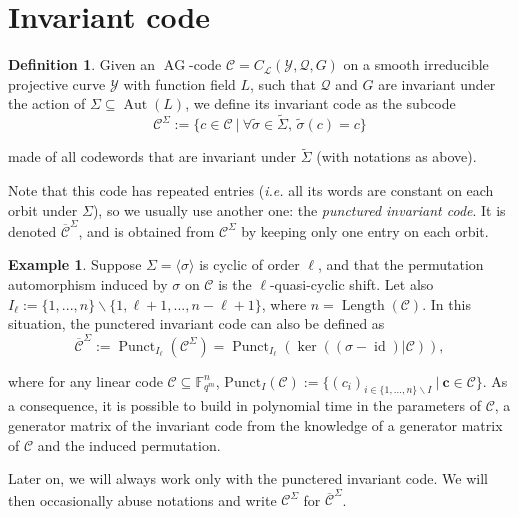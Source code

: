 \documentclass[10pt]{article}
\theoremstyle{definition}
\theoremstyle{definition}
\newtheorem{expl}[thm]{Example}
\theoremstyle{definition}
\newtheorem{def1}[thm]{Definition}
\newcommand{\C}{\mathcal{C}}
\newcommand{\Fqm}{\mathbb{F}_{q^m}}
\newcommand{\su}{\subseteq}
\newcommand{\Y}{\mathcal{Y}}
\newcommand{\QR}{\mathcal{Q}}
\newcommand{\Aut}{\operatorname{Aut}}
\newcommand{\ag}{\operatorname{AG}}
\newcommand{\calL}{\mathcal{L}}
\begin{document}
\section{Invariant code}


\begin{def1} Given an $\ag$-code $\mathcal{C} = C_{\calL}(\Y,\QR,G)$ on a smooth irreducible projective curve $\Y$ with function field $L$, such that $\QR$ and $G$ are invariant under the action of $\Sigma \su \Aut(L)$, we define its invariant code as the subcode 
\[\mathcal{C}^{\Sigma} := \{c \in \mathcal{C} \ | \ \forall\tilde{\sigma}\in\tilde{\Sigma},\,\tilde{\sigma}(c)=c\}\]
\end{def1}
made of all codewords that are invariant under $\tilde{\Sigma}$ (with notations as above).

Note that this code has repeated entries (\textit{i.e.} all its words are constant on each orbit under $\Sigma$), so we usually use another one: the \emph{punctured invariant code}. It is denoted $\overline{\mathcal{C}}^{\Sigma}$, and is obtained from $\C^{\Sigma}$ by keeping only one entry on each orbit.

\begin{expl}  \label{gen inv}
Suppose $\Sigma = \langle \sigma \rangle$ is cyclic of order $\ell$, and that the permutation automorphism induced by $\sigma$ on $\mathcal{C}$ is the $\ell$-quasi-cyclic shift. Let also $I_{\ell} := \{1,...,n\}\backslash \{1,\ell+1,...,n-\ell+1\}$, where $n=\operatorname{Length}(\mathcal{C})$. In this situation, the punctered invariant code can also be defined as
\[ \overline{\mathcal{C}}^{\Sigma} := \operatorname{Punct}_{I_{\ell}}(\mathcal{C}^{\Sigma}) = \operatorname{Punct}_{ I_{\ell}}(\ker ((\sigma-\operatorname{id})|\mathcal{C})),\]

 where for any linear code $\mathcal{C} \su \Fqm^n$, $\mathrm{Punct}_I(\mathcal{C}):= \{(c_i)_{i \in \{1,...,n\}\backslash I} \ | \ \mathbf{c} \in \mathcal{C}\}$. 
As a consequence, it is possible to build in polynomial time in the parameters of $\mathcal{C}$, a generator matrix of the invariant code from the knowledge of a generator matrix of $\mathcal{C}$ and the induced permutation. 
\end{expl}

Later on, we will always work only with the punctered invariant code. We will then occasionally abuse notations and write $\mathcal{C}^{\Sigma}$ for $\overline{\mathcal{C}}^{\Sigma}$.
\end{document}
